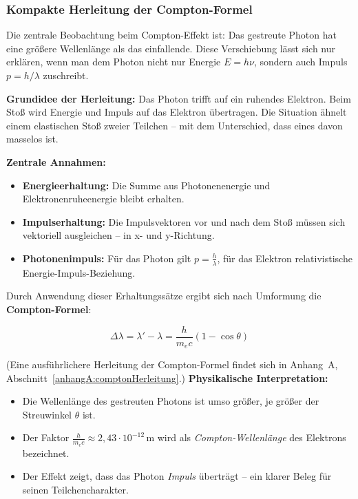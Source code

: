 \subsubsection{Kompakte Herleitung der Compton-Formel}

Die zentrale Beobachtung beim Compton-Effekt ist: Das gestreute Photon hat eine größere Wellenlänge als das einfallende. Diese Verschiebung lässt sich nur erklären, wenn man dem Photon nicht nur Energie \( E = h\nu \), sondern auch Impuls \( p = h/\lambda \) zuschreibt.

\textbf{Grundidee der Herleitung:}
Das Photon trifft auf ein ruhendes Elektron. Beim Stoß wird Energie und Impuls auf das Elektron übertragen. Die Situation ähnelt einem elastischen Stoß zweier Teilchen – mit dem Unterschied, dass eines davon masselos ist.

\textbf{Zentrale Annahmen:}
\begin{itemize}
	\item \textbf{Energieerhaltung:} Die Summe aus Photonenenergie und Elektronenruheenergie bleibt erhalten.
	\item \textbf{Impulserhaltung:} Die Impulsvektoren vor und nach dem Stoß müssen sich vektoriell ausgleichen – in x- und y-Richtung.
	\item \textbf{Photonenimpuls:} Für das Photon gilt \( p = \frac{h}{\lambda} \), für das Elektron relativistische Energie-Impuls-Beziehung.
\end{itemize}

Durch Anwendung dieser Erhaltungssätze ergibt sich nach Umformung die \textbf{Compton-Formel}:

\medskip
\begin{tcolorbox}[mathebox, title=Compton-Formel]
	\label{box:comptonFormel}
	\small
	\[
	\Delta \lambda = \lambda' - \lambda = \frac{h}{m_e c}(1 - \cos \theta)
	\]
\end{tcolorbox}
\medskip
(Eine ausführlichere Herleitung der Compton-Formel findet sich in Anhang~A, Abschnitt~\ref{anhangA:comptonHerleitung}.) %
\textbf{Physikalische Interpretation:}
\begin{itemize}
	\item Die Wellenlänge des gestreuten Photons ist umso größer, je größer der Streuwinkel \( \theta \) ist.
	\item Der Faktor \( \frac{h}{m_e c} \approx 2{,}43 \cdot 10^{-12}\,\mathrm{m} \) wird als \emph{Compton-Wellenlänge} des Elektrons bezeichnet.
	\item Der Effekt zeigt, dass das Photon \emph{Impuls} überträgt – ein klarer Beleg für seinen Teilchencharakter.
\end{itemize}

